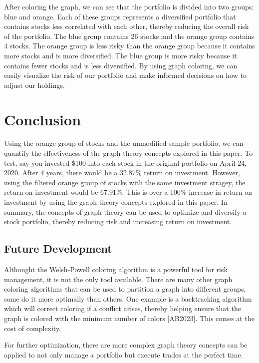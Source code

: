 \documentclass{article}
\begin{document}
After coloring the graph, we can see that the portfolio is divided into two groups: blue and orange. Each of these groups represents a diversified portfolio that contains stocks less correlated with each other, thereby reducing the overall risk of the portfolio. The blue group contains 26 stocks and the orange group contains 4 stocks. The orange group is less risky than the orange group because it contains more stocks and is more diversified. The blue group is more risky because it contains fewer stocks and is less diversified. By using graph coloring, we can easily visualize the risk of our portfolio and make informed decisions on how to adjust our holdings. 

\section{Conclusion}

Using the orange group of stocks and the unmodified sample portfolio, we can quantify the effectiveness of the graph theory concepts explored in this paper. To test, say you invested \$100 into each stock in the original portfolio on April 24, 2020. After 4 years, there would be a 32.87\% return on investment. However, using the filtered orange group of stocks with the same investment stragey, the return on investment would be 67.91\%. This is over a 100\% increase in return on investment by using the graph theory concepts explored in this paper. In summary, the concepts of graph theory can be used to optimize and diversify a stock portfolio, thereby reducing risk and increasing return on investment. 


\subsection{Future Development}

Althought the Welsh-Powell coloring algorithm is a powerful tool for risk management, it is not the only tool available. There are many other graph coloring algorithms that can be used to partition a graph into different groups, some do it more optimally than others. One example is a backtracking algorithm which will correct coloring if a conflict arises, thereby helping ensure that the graph is colored with the minimum number of colors [AB2023]. This comes at the cost of complexity.

For further optimization, there are more complex graph theory concepts can be applied to not only manage a portfolio but execute trades at the perfect time. 
\end{document}
